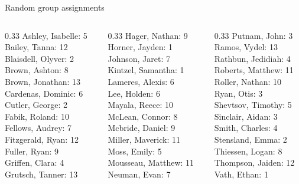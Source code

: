 \documentclass[10pt]{beamer}
\begin{document}
\begin{frame}{Random group assignments}
\begin{columns}
\begin{column}{0.33\textwidth}
Ashley, Isabelle: 5 \\ 
Bailey, Tanna: 12 \\ 
Blaisdell, Olyver: 2 \\ 
Brown, Ashton: 8 \\ 
Brown, Jonathan: 13 \\ 
Cardenas, Dominic: 6 \\ 
Cutler, George: 2 \\ 
Fabik, Roland: 10 \\ 
Fellows, Audrey: 7 \\ 
Fitzgerald, Ryan: 12 \\ 
Fuller, Ryan: 9 \\ 
Griffen, Clara: 4 \\ 
Grutsch, Tanner: 13 \\\end{column}
\begin{column}{0.33\textwidth}
Hager, Nathan: 9 \\ 
Horner, Jayden: 1 \\ 
Johnson, Jaret: 7 \\ 
Kintzel, Samantha: 1 \\ 
Lameres, Alexis: 6 \\ 
Lee, Holden: 6 \\ 
Mayala, Reece: 10 \\ 
McLean, Connor: 8 \\ 
Mcbride, Daniel: 9 \\ 
Miller, Maverick: 11 \\ 
Moss, Emily: 5 \\ 
Mousseau, Matthew: 11 \\ 
Neuman, Evan: 7 \\\end{column}
\begin{column}{0.33\textwidth}
Putnam, John: 3 \\ 
Ramos, Vydel: 13 \\ 
Rathbun, Jedidiah: 4 \\ 
Roberts, Matthew: 11 \\ 
Roller, Nathan: 10 \\ 
Ryan, Otis: 3 \\ 
Shevtsov, Timothy: 5 \\ 
Sinclair, Aidan: 3 \\ 
Smith, Charles: 4 \\ 
Stensland, Emma: 2 \\ 
Thiessen, Logan: 8 \\ 
Thompson, Jaiden: 12 \\ 
Vath, Ethan: 1 \\\end{column}
\end{columns}
\end{frame}
\end{document}
